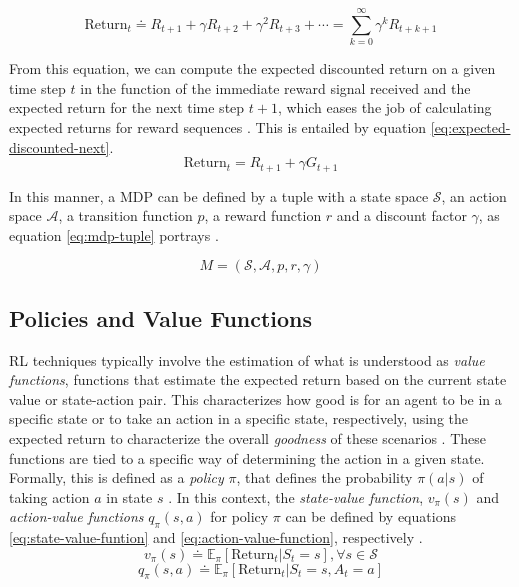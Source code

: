 \begin{equation} \label{eq:expected-discounted-return}
	\text{Return}_t \doteq R_{t+1} + \gamma R_{t+2} + \gamma^2 R_{t+3} + \cdots = \sum^\infty_{k = 0} \gamma^k R_{t+k+1}
\end{equation}

From this equation, we can compute the expected discounted return on a given time step $t$ in the function of the immediate reward signal received and the expected return for the next time step $t +1$, which eases the job of calculating expected returns for reward sequences \cite{suttonReinforcementLearningIntroduction2014}. This is entailed by equation \ref{eq:expected-discounted-next}.
\begin{equation} \label{eq:expected-discounted-next}
	\text{Return}_t = R_{t+1} + \gamma G_{t+1}
\end{equation}

In this manner, a \ac{MDP} can be defined by a tuple with a state space $\mathcal{S}$, an action space $\mathcal{A}$, a transition function $p$, a reward function $r$ and a discount factor $\gamma$, as equation \ref{eq:mdp-tuple} portrays \cite{brunskillCS234ReinforcementLearning}.

\begin{equation} \label{eq:mdp-tuple}
	M = (\mathcal{S}, \mathcal{A}, p, r, \gamma)
\end{equation}

\subsection{Policies and Value Functions}

\ac{RL} techniques typically involve the estimation of what is understood as \textit{value functions}, functions that estimate the expected return based on the current state value or state-action pair. This characterizes how good is for an agent to be in a specific state or to take an action in a specific state, respectively, using the expected return to characterize the overall \textit{goodness} of these scenarios \cite{suttonReinforcementLearningIntroduction2014, moralesGrokkingDeepReinforcement2020}. These functions are tied to a specific way of determining the action in a given state. Formally, this is defined as a \textit{policy} $\pi$, that defines the probability $\pi(a|s)$ of taking action $a$ in state $s$ \cite{suttonReinforcementLearningIntroduction2014}. In this context, the \textit{state-value function}, $v_\pi(s)$ and \textit{action-value functions} $q_\pi(s,a)$ for policy $\pi$ can be defined by equations \ref{eq:state-value-funtion} and \ref{eq:action-value-function}, respectively \cite{suttonReinforcementLearningIntroduction2014}.
\begin{equation} \label{eq:state-value-funtion}
	v_\pi(s) \doteq \mathbb{E}_\pi[\text{Return}_t | S_t = s], \forall s \in \mathcal{S}
\end{equation}
\begin{equation} \label{eq:action-value-function}
	q_\pi(s,a) \doteq \mathbb{E}_\pi[\text{Return}_t | S_t = s, A_t = a]    
\end{equation}


